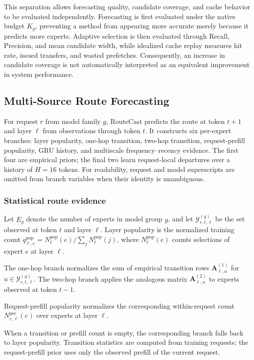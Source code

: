 \documentclass[conference]{IEEEtran}
\begin{document}
This separation allows forecasting quality, candidate coverage, and cache
behavior to be evaluated independently. Forecasting is first evaluated under
the native budget \(K_g\), preventing a method from appearing more accurate
merely because it predicts more experts. Adaptive selection is then evaluated
through Recall, Precision, and mean candidate width, while idealized cache replay
measures hit rate, issued transfers, and wasted prefetches. Consequently, an
increase in candidate coverage is not automatically interpreted as an
equivalent improvement in system performance.
\subsection{Multi-Source Route Forecasting}

For request \(r\) from model family \(g\), RouteCast predicts the route at
token \(t+1\) and layer \(\ell\) from observations through token \(t\). It
constructs six per-expert branches: layer popularity, one-hop transition,
two-hop transition, request-prefill popularity, GRU history, and multiscale
frequency--recency evidence. The first four are empirical priors; the final
two learn request-local departures over a history of \(H=16\) tokens. For
readability, request and model superscripts are omitted from branch variables
when their identity is unambiguous.

\subsubsection{Statistical route evidence}

Let \(E_g\) denote the number of experts in model group \(g\), and let
\(\mathcal{Y}_{r,t,\ell}^{(g)}\) be the set observed at token \(t\) and
layer \(\ell\). Layer popularity is the normalized training count
\(q_{\ell,e}^{\mathrm{pop}}=N_{\ell}^{\mathrm{pop}}(e)/
\sum_jN_{\ell}^{\mathrm{pop}}(j)\), where
\(N_{\ell}^{\mathrm{pop}}(e)\) counts selections of expert \(e\) at layer
\(\ell\).

The one-hop branch normalizes the sum of empirical transition rows
\(\mathbf{A}_{\ell,u}^{(1)}\) for
\(u\in\mathcal{Y}_{r,t,\ell}^{(g)}\). The two-hop branch applies the analogous
matrix \(\mathbf{A}_{\ell,u}^{(2)}\) to experts observed at token \(t-1\).

Request-prefill popularity normalizes the corresponding within-request count
\(N_{r,\ell}^{\mathrm{pre}}(e)\) over experts at layer \(\ell\).

When a transition or prefill count is empty, the corresponding branch falls
back to layer popularity. Transition statistics are computed from training requests;
the request-prefill prior uses only the observed prefill of the current
request.
\end{document}
